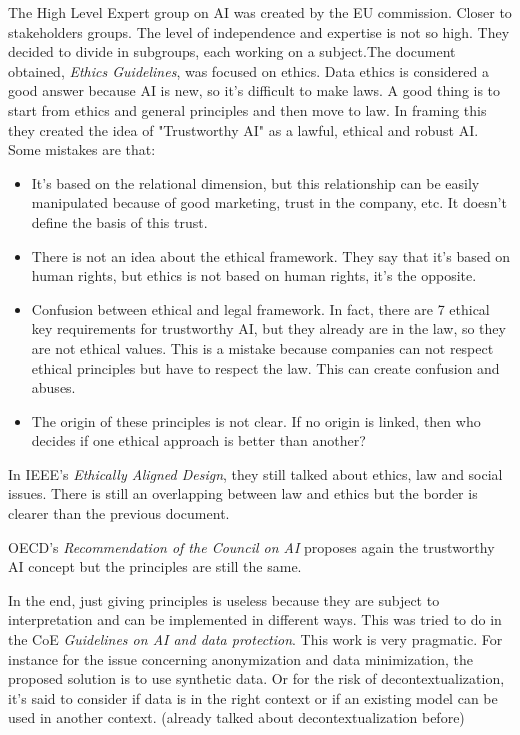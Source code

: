 The High Level Expert group on AI was created by the EU commission. Closer to stakeholders groups. The level of independence and expertise is not so high. They decided to divide in subgroups, each working on a subject.The document obtained, \textit{Ethics Guidelines}, was focused on ethics. Data ethics is considered a good answer because AI is new, so it's difficult to make laws. A good thing is to start from ethics and general principles and then move to law. In framing this they created the idea of "Trustworthy AI" as a lawful, ethical and robust AI. Some mistakes are that:
\begin{itemize}
    \item It's based on the relational dimension, but this relationship can be easily manipulated because of good marketing, trust in the company, etc. It doesn't define the basis of this trust.
    \item There is not an idea about the ethical framework. They say that it's based on human rights, but ethics is not based on human rights, it's the opposite.
    \item Confusion between ethical and legal framework. In fact, there are 7 ethical key requirements for trustworthy AI, but they already are in the law, so they are not ethical values. This is a mistake because companies can not respect ethical principles but have to respect the law. This can create confusion and abuses.
    \item The origin of these principles is not clear. If no origin is linked, then who decides if one ethical approach is better than another?
\end{itemize}

In IEEE's \textit{Ethically Aligned Design}, they still talked about ethics, law and social issues. There is still an overlapping between law and ethics but the border is clearer than the previous document.

OECD's \textit{Recommendation of the Council on AI} proposes again the trustworthy AI concept but the principles are still the same.

In the end, just giving principles is useless because they are subject to interpretation and can be implemented in different ways. This was tried to do in the CoE \textit{Guidelines on AI and data protection}. This work is very pragmatic. For instance for the issue concerning anonymization and data minimization, the  proposed solution is to use synthetic data. Or for the risk of decontextualization, it's said to consider if data is in the right context or if an existing model can be used in another context. (already talked about decontextualization before)

